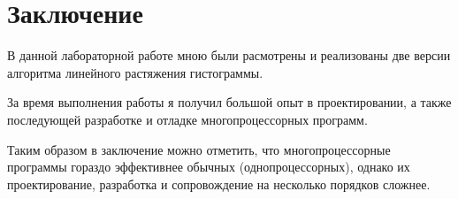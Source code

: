 \section*{Заключение}

В данной лабораторной работе мною были расмотрены и реализованы две версии алгоритма линейного растяжения гистограммы.\newline

За время выполнения работы я получил большой опыт в проектировании, а также последующей разработке и отладке многопроцессорных программ.\newline

Таким образом в заключение можно отметить, что многопроцессорные программы гораздо эффективнее обычных (однопроцессорных), однако их проектирование, разработка и сопровождение на несколько порядков сложнее.